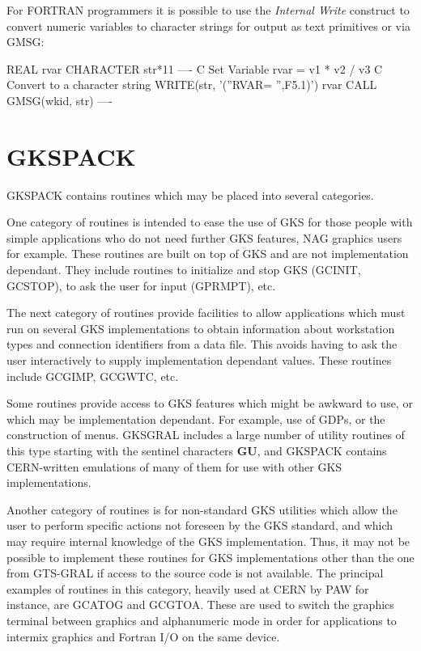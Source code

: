For FORTRAN programmers it is possible to use the {\it Internal Write}
construct to convert numeric variables to character strings for output as
text primitives or via GMSG:
\begin{XMP}
      REAL      rvar
      CHARACTER str*11
        ----
C     Set Variable
      rvar = v1 * v2 / v3
C     Convert to a character string
      WRITE(str, '(''RVAR= '',F5.1)') rvar
      CALL GMSG(wkid, str)
        ----
\end{XMP}
\section{\protect\label{sec:gkspref}GKSPACK}
 
GKSPACK contains routines which may be placed into several categories.
\begin{UL}
\item
One category of routines is intended to ease the use of GKS for
those people with simple applications who do not need further GKS features,
NAG graphics users for example. These routines are built on top
of GKS and are not implementation dependant. They include
routines to initialize and stop GKS (GCINIT, GCSTOP),
to ask the user for input (GPRMPT), etc.
\item
The next category of routines provide facilities to allow applications
which must run on several GKS implementations to obtain information
about workstation types and connection identifiers from a data file.
This avoids having to ask the user interactively to supply implementation
dependant values. These routines include GCGIMP, GCGWTC, etc.
\item
Some routines provide access to GKS features which might be awkward to use,
or which may be implementation dependant. For example, use of GDPs,
or the construction of menus. GKSGRAL includes a large number of utility
routines of this type starting with the sentinel characters {\bf GU},
and GKSPACK contains CERN-written emulations of many of them for
use with other GKS implementations.
\item
Another category of routines is for non-standard GKS utilities which allow the
user to perform specific actions not foreseen by the GKS standard, and which may
require internal knowledge of the GKS implementation.
Thus, it may not be possible to implement these routines for GKS
implementations other than the one from GTS-GRAL if access to the source
code is not available.
The principal examples of routines in this category, heavily used
at CERN by PAW for instance, are GCATOG and GCGTOA. These are used to switch
the graphics terminal between graphics and alphanumeric mode in order for
applications to intermix graphics and Fortran I/O on the same device.
\end{UL}
 
